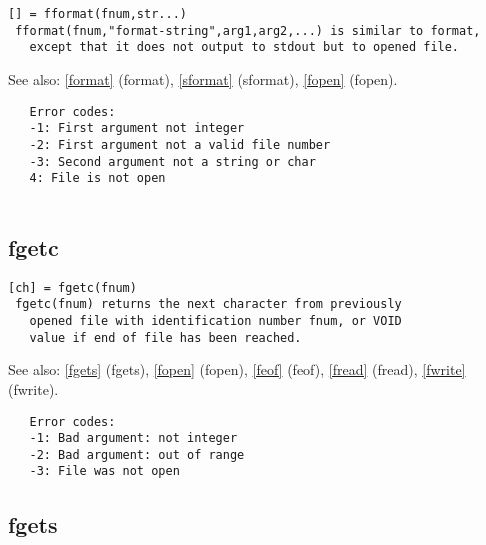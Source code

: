 \documentclass[a4paper]{article}
\begin{document}
\begin{tscreen}
\begin{verbatim}
[] = fformat(fnum,str...)
 fformat(fnum,"format-string",arg1,arg2,...) is similar to format,
   except that it does not output to stdout but to opened file.
\end{verbatim}

See also: \ref{format} {(format)}, \ref{sformat} {(sformat)}, \ref{fopen} {(fopen)}.
\begin{verbatim}
   Error codes:
   -1: First argument not integer
   -2: First argument not a valid file number
   -3: Second argument not a string or char
   4: File is not open
   
\end{verbatim}
\end{tscreen}



\subsection{fgetc\label{fgetc}}

\begin{tscreen}
\begin{verbatim}
[ch] = fgetc(fnum)
 fgetc(fnum) returns the next character from previously
   opened file with identification number fnum, or VOID
   value if end of file has been reached.
\end{verbatim}

See also: \ref{fgets} {(fgets)}, \ref{fopen} {(fopen)}, \ref{feof} {(feof)}, \ref{fread} {(fread)}, \ref{fwrite} {(fwrite)}.
\begin{verbatim}
   Error codes:
   -1: Bad argument: not integer
   -2: Bad argument: out of range
   -3: File was not open
\end{verbatim}
\end{tscreen}



\subsection{fgets\label{fgets}}
\end{document}
